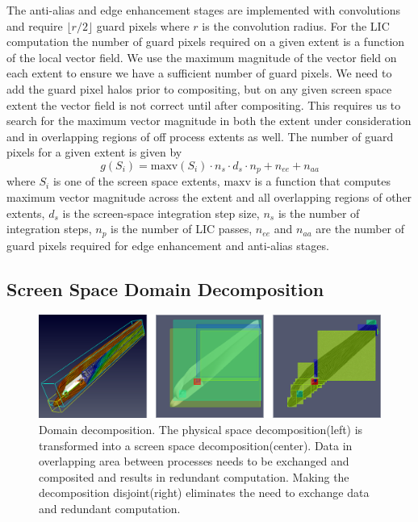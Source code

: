 \documentclass[a4paper,10pt]{article}
\begin{document}
The anti-alias and edge enhancement stages are implemented with convolutions and require $\lfloor r/2 \rfloor$ guard pixels where $r$ is the convolution radius. For the LIC computation the number of guard pixels required on a given extent is a function of the local vector field. We use the maximum magnitude of the vector field on each extent to ensure we have a sufficient number of guard pixels. We need to add the guard pixel halos prior to compositing, but on any given screen space extent the vector field is not correct until after compositing. This requires us to search for the maximum vector magnitude in both the extent under consideration and in overlapping regions of off process extents as well. The number of guard pixels for a given extent is given by
\begin{equation}
  g(S_{i}) = \textrm{maxv}(S_{i}) \cdot n_s \cdot d_s \cdot n_p + n_{ee} + n_{aa}
\label{eqn:gaurd}
\end{equation}
where $S_i$ is one of the screen space extents, $\textrm{maxv}$ is a function that computes maximum vector magnitude across the extent and all overlapping regions of other extents, $d_s$ is the screen-space integration step size, $n_s$ is the number of integration steps, $n_p$ is the number of LIC passes, $n_{ee}$ and $n_{aa}$ are the number of guard pixels required for edge enhancement and anti-alias stages.

\subsection{Screen Space Domain Decomposition}
\begin{figure}
 \centering
 \includegraphics[width=\textwidth]{shuttle-inplace-disj.png}
 \caption{\small Domain decomposition. The physical space decomposition(left) is transformed into a screen space decomposition(center). Data in overlapping area between processes needs to be exchanged and composited and results in redundant computation. Making the decomposition disjoint(right) eliminates the need to exchange data and redundant computation.}
 \label{fig:decomps}
\end{figure}
\end{document}
